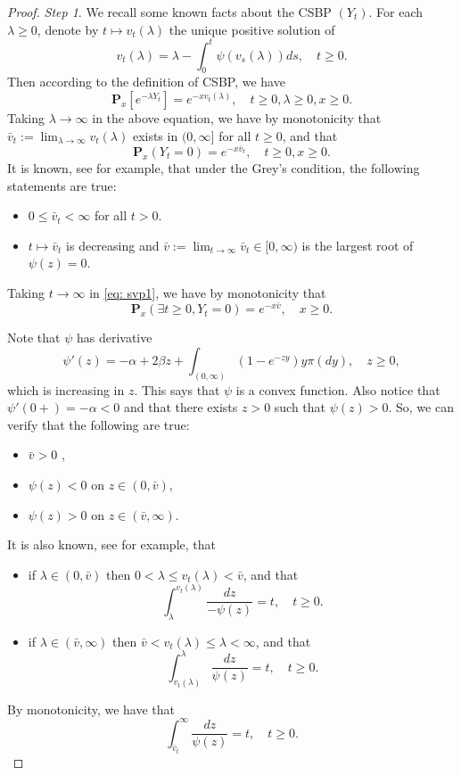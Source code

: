 \documentclass[12pt,a4paper]{amsart}
\theoremstyle{plain}
\theoremstyle{definition}
\numberwithin{equation}{section}
\begin{document}
\begin{proof}
    \emph{Step 1}. We recall some known facts about the CSBP $(Y_t)$. 
    For each $\lambda \geq 0$, denote by $t\mapsto v_t(\lambda)$ the unique positive solution of 
\[
    v_t(\lambda) 
    = \lambda - \int_0^t \psi(v_s(\lambda))ds,\quad t\geq 0.
\]
    Then according to the definition of CSBP, we have
\[
    \mathbf P_x[e^{-\lambda Y_t}] = e^{-xv_t(\lambda)}, \quad t\geq 0, \lambda \geq 0, x\geq 0.
\]
    Taking $\lambda \to \infty$ in the above equation, we have by monotonicity that $\bar v_t:= \lim_{\lambda \to \infty}v_t(\lambda)$ exists in $(0,\infty]$ for all $t\geq 0$, and that
\begin{equation}
\label{eq: svp1}
    \mathbf P_x(Y_t = 0)=e^{-x\bar v_t}, \quad t\geq 0, x\ge 0.
\end{equation}
    It is known, see \cite[Theorem 3.5-3.8]{Li2011Measure-valued} for example, that under the Grey's condition, the following statements are true:
\begin{itemize}
\item
    $0\leq \bar v_t < \infty$ for all $t>0$.
\item 
    $t\mapsto \bar v_t$ is decreasing and $\bar v:= \lim_{t\to \infty} \bar v_t \in [0,\infty)$ is the largest root of $\psi(z) = 0$.
\end{itemize}
    Taking $t \to \infty$ in \eqref{eq: svp1}, we have by monotonicity that
\[
    \mathbf P_x(\exists t \geq 0, Y_t = 0) 
    = e^{-x\bar v}, \quad x\geq 0.
\]

    Note that $\psi$ has derivative 
\[
    \psi'(z) 
    = -\alpha + 2\beta z + \int_{(0,\infty)}(1-e^{-zy})y\pi(dy),\quad z\geq 0,
\]
    which is increasing in $z$. 
    This says that $\psi$ is a convex function. 
    Also notice that $\psi'(0+)=-\alpha <0$ and that there exists $z>0$ such that $\psi(z)>0$. 
    So, we can verify that the following are true: 
\begin{itemize}
\item
    $\bar v > 0$ , 
\item
    $\psi(z) < 0$ on $z\in (0,\bar v)$, 
\item
    $\psi(z) > 0 $ on $z\in (\bar v, \infty)$.
\end{itemize}
    It is also known, see \cite[Proposition 3.3]{Li2011Measure-valued} for example, that
\begin{itemize}
\item
    if $\lambda \in (0,\bar v)$ then $0<\lambda \leq v_t(\lambda)<\bar v $, and that
\[
    \int_{\lambda}^{v_t(\lambda)} \frac{dz}{-\psi(z)} = t, \quad t\geq 0.
\]
\item
    if $\lambda \in (\bar v, \infty)$ then $\bar v < v_t(\lambda)\leq \lambda< \infty $, and that
\[
  \int_{v_t(\lambda)}^\lambda\frac{dz}{\psi(z)} = t, \quad t\geq 0.
\]
\end{itemize}
    By monotonicity, we have that
\begin{equation}
\label{eq:svp2}
    \int_{\bar v_t}^\infty \frac{dz}{\psi(z)} = t, \quad t\geq 0.
\end{equation}


\end{proof}
\end{document}
